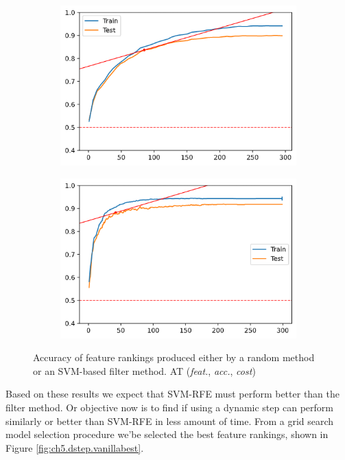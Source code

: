 \begin{figure}[H]
    \centering
    \begin{subfigure}[b]{0.4\linewidth}
        \includegraphics[width=\linewidth]{img/ch5/dstep/random.png}
    \end{subfigure}
    \begin{subfigure}[b]{0.4\linewidth}
        \includegraphics[width=\linewidth]{img/ch5/dstep/filter.png}
    \end{subfigure}
    \caption[Dynamic step: Random vs Filter]{Accuracy of feature rankings produced either by a random method or an SVM-based filter method. AT (\emph{feat.}, \emph{acc.}, \emph{cost})}
    \label{fig:ch5.dstep.init}
\end{figure}

Based on these results we expect that SVM-RFE must perform better than the filter method. Or objective now is to find if using a dynamic step can perform similarly or better than SVM-RFE in less amount of time. From a grid search model selection procedure we'be selected the best feature rankings, shown in Figure \ref{fig:ch5.dstep.vanillabest}.


